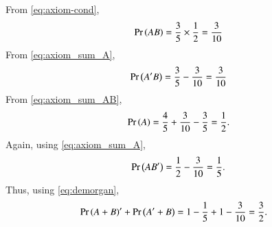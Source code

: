 From \eqref{eq:axiom-cond},
\begin{align}
\Pr\left(AB\right) = \frac{3}{5}\times \frac{1}{2} = \frac{3}{10}
\end{align}
From \eqref{eq:axiom_sum_A},
\begin{align}
	\Pr\left(A'B\right) =  
 \frac{3}{5}- \frac{3}{10}
 =\frac{3}{10}
\end{align}
From \eqref{eq:axiom_sum_AB},
\begin{align}
\Pr\left(A\right) = \frac{4}{5}+ \frac{3}{10}
- \frac{3}{5} = 
 \frac{1}{2}.  
\end{align}
Again, using \eqref{eq:axiom_sum_A},
\begin{align}
	\Pr\left(AB'\right) =  \frac{1}{2} - \frac{3}{10} = \frac{1}{5}.
\end{align}
Thus, 
	using \eqref{eq:demorgan},
\begin{align}
\Pr\left(A + B\right)^{\prime} + \Pr\left(A^{\prime} + B\right) 
	&=1 -\frac{1}{5} + 1- \frac{3}{10}
= \frac{3}{2}.
\end{align}
